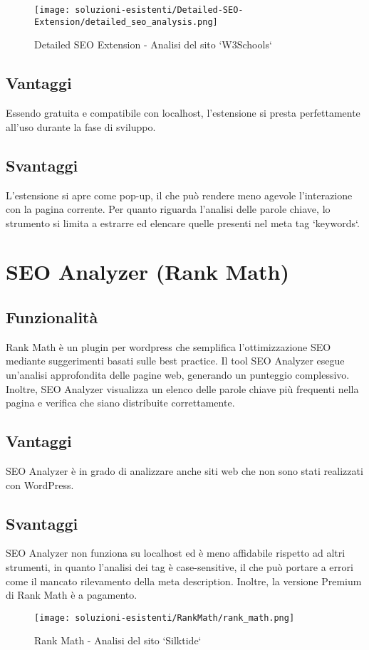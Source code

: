 \begin{figure}[H]
    \centering 
    \texttt{[image: soluzioni-esistenti/Detailed-SEO-Extension/detailed\_seo\_analysis.png]} 
    \caption{Detailed SEO Extension - Analisi del sito `W3Schools`}
\end{figure}

\subsection{Vantaggi}
\par Essendo gratuita e compatibile con \gls{localhost}, l'estensione si presta perfettamente all'uso durante la fase di sviluppo.

\subsection{Svantaggi}
\par L'estensione si apre come pop-up, il che può rendere meno agevole l'interazione con la pagina corrente. Per quanto riguarda l'analisi delle parole chiave, lo strumento si limita a estrarre ed elencare quelle presenti nel meta tag `keywords`.

\section{SEO Analyzer (Rank Math)}

\subsection{Funzionalità}
\par Rank Math è un plugin per \gls{wordpress} che semplifica l'ottimizzazione SEO mediante suggerimenti basati sulle best practice. Il tool SEO Analyzer esegue un'analisi approfondita delle pagine web, generando un punteggio complessivo. Inoltre, SEO Analyzer visualizza un elenco delle parole chiave più frequenti nella pagina e verifica che siano distribuite correttamente.

\subsection{Vantaggi}
\par SEO Analyzer è in grado di analizzare anche siti web che non sono stati realizzati con WordPress.

\subsection{Svantaggi}
\par SEO Analyzer non funziona su \gls{localhost} ed è meno affidabile rispetto ad altri strumenti, in quanto l'analisi dei tag è \gls{case-sensitive}, il che può portare a errori come il mancato rilevamento della meta description. Inoltre, la versione Premium di Rank Math è a pagamento.

\begin{figure}[H]
    \centering 
    \texttt{[image: soluzioni-esistenti/RankMath/rank\_math.png]} 
    \caption{Rank Math - Analisi del sito `Silktide`}
\end{figure}